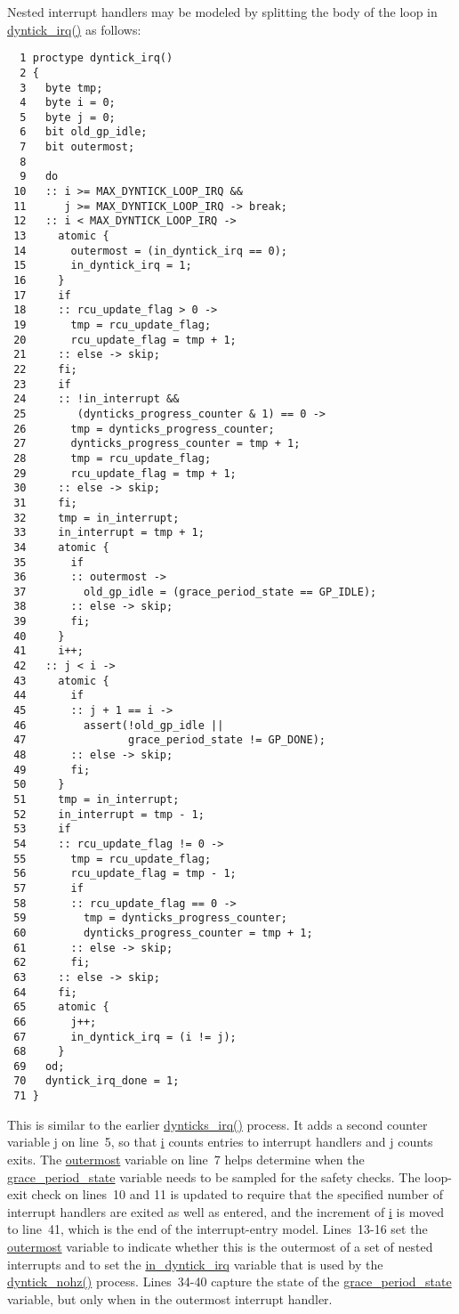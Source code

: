 Nested interrupt handlers may be modeled by splitting the body of
the loop in \url{dyntick_irq()} as follows:

{ \scriptsize
\begin{verbatim}
  1 proctype dyntick_irq()
  2 {
  3   byte tmp;
  4   byte i = 0;
  5   byte j = 0;
  6   bit old_gp_idle;
  7   bit outermost;
  8 
  9   do
 10   :: i >= MAX_DYNTICK_LOOP_IRQ &&
 11      j >= MAX_DYNTICK_LOOP_IRQ -> break;
 12   :: i < MAX_DYNTICK_LOOP_IRQ ->
 13     atomic {
 14       outermost = (in_dyntick_irq == 0);
 15       in_dyntick_irq = 1;
 16     }
 17     if
 18     :: rcu_update_flag > 0 ->
 19       tmp = rcu_update_flag;
 20       rcu_update_flag = tmp + 1;
 21     :: else -> skip;
 22     fi;
 23     if
 24     :: !in_interrupt &&
 25        (dynticks_progress_counter & 1) == 0 ->
 26       tmp = dynticks_progress_counter;
 27       dynticks_progress_counter = tmp + 1;
 28       tmp = rcu_update_flag;
 29       rcu_update_flag = tmp + 1;
 30     :: else -> skip;
 31     fi;
 32     tmp = in_interrupt;
 33     in_interrupt = tmp + 1;
 34     atomic {
 35       if
 36       :: outermost ->
 37         old_gp_idle = (grace_period_state == GP_IDLE);
 38       :: else -> skip;
 39       fi;
 40     }
 41     i++;
 42   :: j < i ->
 43     atomic {
 44       if
 45       :: j + 1 == i ->
 46         assert(!old_gp_idle ||
 47                grace_period_state != GP_DONE);
 48       :: else -> skip;
 49       fi;
 50     }
 51     tmp = in_interrupt;
 52     in_interrupt = tmp - 1;
 53     if
 54     :: rcu_update_flag != 0 ->
 55       tmp = rcu_update_flag;
 56       rcu_update_flag = tmp - 1;
 57       if
 58       :: rcu_update_flag == 0 ->
 59         tmp = dynticks_progress_counter;
 60         dynticks_progress_counter = tmp + 1;
 61       :: else -> skip;
 62       fi;
 63     :: else -> skip;
 64     fi;
 65     atomic {
 66       j++;
 67       in_dyntick_irq = (i != j);
 68     }
 69   od;
 70   dyntick_irq_done = 1;
 71 }
\end{verbatim}
}

This is similar to the earlier \url{dynticks_irq()} process.
It adds a second counter variable \url{j} on line~5, so that
\url{i} counts entries to interrupt handlers and \url{j}
counts exits.
The \url{outermost} variable on line~7 helps determine
when the \url{grace_period_state} variable needs to be sampled
for the safety checks.
The loop-exit check on lines~10 and 11 is updated to require that the
specified number of interrupt handlers are exited as well as entered,
and the increment of \url{i} is moved to line~41, which is
the end of the interrupt-entry model.
Lines~13-16 set the \url{outermost} variable to indicate
whether this is the outermost of a set of nested interrupts and to
set the \url{in_dyntick_irq} variable that is used by the
\url{dyntick_nohz()} process.
Lines~34-40 capture the state of the \url{grace_period_state}
variable, but only when in the outermost interrupt handler.

